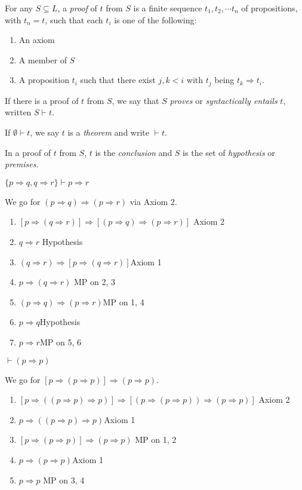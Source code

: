 \documentclass[a4paper]{article}
\begin{document}
\begin{defi}
  For any $S\subseteq L$, a \emph{proof} of $t$ from $S$ is a finite sequence $t_1, t_2, \cdots t_n$ of propositions, with $t_n = t$, such that each $t_i$ is one of the following:
  \begin{enumerate}
    \item An axiom
    \item A member of $S$
    \item A proposition $t_i$ such that there exist $j, k < i$ with $t_j$ being $t_k\Rightarrow t_i$.
  \end{enumerate}
  If there is a proof of $t$ from $S$, we say that $S$ \emph{proves} or \emph{syntactically entails} $t$, written $S\vdash t$.

  If $\emptyset \vdash t$, we say $t$ is a \emph{theorem} and write $\vdash t$.

  In a proof of $t$ from $S$, $t$ is the \emph{conclusion} and $S$ is the set of \emph{hypothesis} or \emph{premises}.
\end{defi}
\begin{eg}
  $\{p\Rightarrow q, q\Rightarrow r\} \vdash p\Rightarrow r$

  We go for $(p\Rightarrow q)\Rightarrow (p\Rightarrow r)$ via Axiom 2.
  \begin{enumerate}[label=\arabic{*}.]
    \item $[p\Rightarrow (q\Rightarrow r)]\Rightarrow [(p\Rightarrow q) \Rightarrow (p\Rightarrow r)]$ \hfill Axiom 2
    \item $q\Rightarrow r$ \hfill Hypothesis
    \item $(q\Rightarrow r)\Rightarrow [p\Rightarrow (q\Rightarrow r)]$\hfill Axiom 1
    \item $p\Rightarrow (q\Rightarrow r)$ \hfill MP on 2, 3
    \item $(p\Rightarrow q)\Rightarrow (p\Rightarrow r)$\hfill MP on 1, 4
    \item $p\Rightarrow q$\hfill Hypothesis
    \item $p\Rightarrow r$\hfill MP on 5, 6
  \end{enumerate}
\end{eg}

\begin{eg}
  $\vdash (p\Rightarrow p)$

  We go for $[p\Rightarrow (p\Rightarrow p)]\Rightarrow (p\Rightarrow p)$.
  \begin{enumerate}[label=\arabic{*}.]
    \item $[p\Rightarrow ((p\Rightarrow p)\Rightarrow p)]\Rightarrow [(p\Rightarrow (p\Rightarrow p))\Rightarrow (p\Rightarrow p)]$ \hfill Axiom 2
    \item $p\Rightarrow ( (p\Rightarrow p)\Rightarrow p)$\hfill Axiom 1
    \item $[p\Rightarrow (p\Rightarrow p)]\Rightarrow (p\Rightarrow p)$ \hfill MP on 1, 2
    \item $p\Rightarrow (p\Rightarrow p)$\hfill Axiom 1
    \item $p\Rightarrow p$ \hfill MP on 3, 4
  \end{enumerate}
\end{eg}
\end{document}
